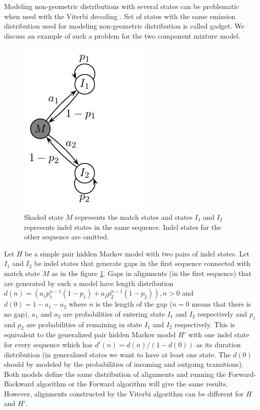 Modeling non-geometric distributions with several states can be problematic when
used with the Viterbi decoding \cite{Vinar2005}. Set of states with the same
emission distribution used for modeling non-geometric distribution is called
gadget. We discuss an example of such a problem for the two component mixture
model.

\begin{figure}
\begin{center}
\includegraphics{../figures/twoComponentMixtureModel.pdf}
\end{center}
\caption[The example of an HMM modeling two component geometric distribution]{
Shaded state $M$ represents the match states and states $I_1$ and $I_2$
represents indel states in the same sequence. Indel states for the other
sequence are omitted.
}\label{FIGURE:TWOCOMPONENT}
\end{figure}

Let $H$ be a simple pair hidden Markov model with two pairs of indel states.
Let $I_1$ and $I_2$ be indel states that generate gaps in the first sequence
connected with match state $M$ as in the figure \ref{FIGURE:TWOCOMPONENT}.  Gaps
in alignments (in the first sequence) that are generated by such a model have
length distribution $d(n)=(a_1p_1^{n-1}(1-p_1)+a_2p_2^{n-1}(1-p_2)), n>0$ and
$d(0) = 1-a_1 - a_2$ where $n$ is the length of the gap ($n=0$ means that there
is no gap), $a_1$ and $a_2$ are probabilities of entering state $I_1$ and $I_2$
respectively and $p_1$ and $p_2$ are probabilities of remaining in state $I_1$
and $I_2$ respectively.  This is equivalent to the generalized pair hidden
Markov model $H'$ with one indel state for every sequence which has
$d'(n)=d(n)/(1-d(0))$ as its duration distribution (in generalized states we
want to have at least one state. The $d(0)$ should by modeled by the
probabilities of incoming and outgoing transitions). Both models define the same
distribution of alignments  and running the Forward-Backward algorithm or the
Forward algorithm will give the same results. However, alignments constructed by
the Viterbi algorithm can be different for $H$ and $H'$.


